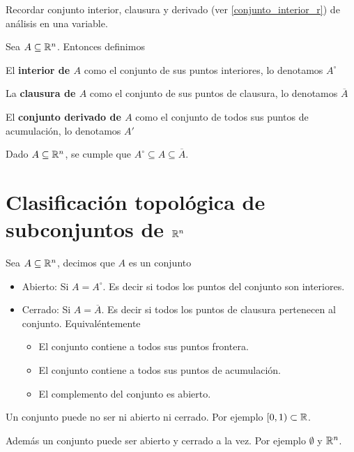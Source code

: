 Recordar conjunto interior, clausura y derivado (ver \ref{conjunto_interior_r}) de análisis en una variable.

\begin{definition}[Interior]
Sea $A \subseteq \mathbb{R}^n$.  Entonces definimos

El \textbf{interior de $A$} como el conjunto de sus puntos interiores, lo denotamos $A^{\circ}$

La \textbf{clausura de $A$} como el conjunto de sus puntos de clausura, lo denotamos $\overline{A}$

El \textbf{conjunto derivado de $A$} como el conjunto de todos sus puntos de acumulación, lo denotamos $A'$
\end{definition}

\begin{observation}

Dado $A \subseteq \mathbb{R}^n$, se cumple que $ A^{\circ} \subseteq A \subseteq \overline{A}$.

\end{observation}

\section{Clasificación topológica de subconjuntos de $\mathbb{R}^n$}

\begin{definition}[Abierto]
Sea $A \subseteq \mathbb{R}^n$, decimos que $A$ es un conjunto

\begin{itemize}
\item Abierto: Si $A=A^{\circ}$.  Es decir si todos los puntos del conjunto son interiores.

\item Cerrado: Si $A = \overline{A}$.  Es decir si todos los puntos de clausura pertenecen al conjunto. Equivaléntemente
\begin{itemize}
\item El conjunto contiene a todos sus puntos frontera.
\item El conjunto contiene a todos sus puntos de acumulación.  
\item El complemento del conjunto es abierto.
\end{itemize}
\end{itemize}
\end{definition}

\begin{observation}
Un conjunto puede no ser ni abierto ni cerrado. Por ejemplo $ [0,1) \subset \mathbb{R}$.

Además un conjunto puede ser abierto y cerrado a la vez. Por ejemplo $ \emptyset$ y $ \mathbb{R}^n$.
\end{observation}

